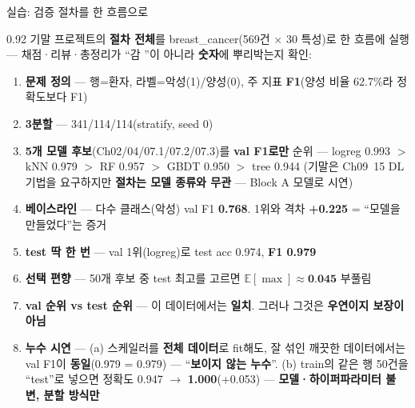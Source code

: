 \begin{frame}[shrink=12]{실습: 검증 절차를 한 흐름으로}
\begin{center}\begin{varwidth}{0.92\textwidth}
  기말 프로젝트의 \textbf{절차 전체}를 breast\_cancer(569건
  $\times$ 30 특성)로 한 흐름에 실행 — 채점·리뷰·총정리가 ``감
  ''이 아니라 \textbf{숫자}에 뿌리박는지 확인:
  \small
  \begin{enumerate}
    \item \textbf{문제 정의} — 행=환자, 라벨=악성(1)/양성(0),
      주 지표 \textbf{F1}(양성 비율 62.7\%라 정확도보다 F1)
    \item \textbf{3분할} — 341/114/114(stratify, seed 0)
    \item \textbf{5개 모델 후보}(Ch02/04/07.1/07.2/07.3)를
      \textbf{val F1로만} 순위 — logreg 0.993 $>$ kNN 0.979 $>$
      RF 0.957 $>$ GBDT 0.950 $>$ tree 0.944 (기말은 Ch09~15
      DL 기법을 요구하지만 \textbf{절차는 모델 종류와 무관} —
      Block A 모델로 시연)
    \item \textbf{베이스라인} — 다수 클래스(악성) val F1
      \textbf{0.768}. 1위와 격차 \textbf{+0.225} = ``모델을
      만들었다''는 증거
    \item \textbf{test 딱 한 번} — val 1위(logreg)로 test
      acc 0.974, \textbf{F1 0.979}
    \item \textbf{선택 편향} — 50개 후보 중 test 최고를 고르면
      $\mathbb{E}[\max]\approx\textbf{0.045}$ 부풀림
    \item \textbf{val 순위 vs test 순위} — 이 데이터에서는
      \textbf{일치}. 그러나 그것은 \textbf{우연이지 보장이
      아님}
    \item \textbf{누수 시연} — (a) 스케일러를 \textbf{전체
      데이터}로 fit해도, 잘 섞인 깨끗한 데이터에서는 val F1이
      \textbf{동일}(0.979 = 0.979) — ``\textbf{보이지 않는
      누수}''. (b) train의 같은 행 50건을 ``test''로 넣으면
      정확도 0.947 $\to$ \textbf{1.000}(+0.053) —
      \textbf{모델·하이퍼파라미터 불변, 분할 방식만}
  \end{enumerate}
\end{varwidth}\end{center}
\end{frame}
